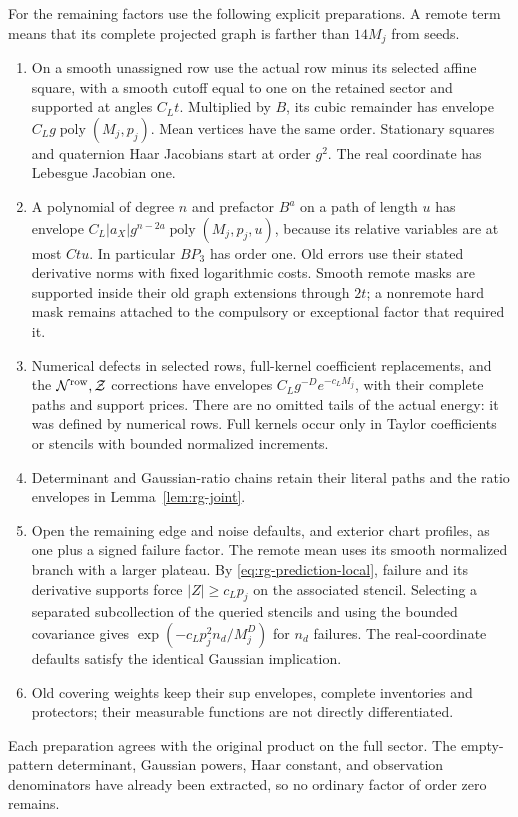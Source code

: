 For the remaining factors use the following explicit preparations.
A remote term means that its complete projected graph is farther than
$14M_j$ from seeds.
\begin{enumerate}[label=\textup{(\roman*)}]
\item On a smooth unassigned row use the actual row minus its selected
      affine square, with a smooth cutoff equal to one on the retained
      sector and supported at angles $C_Lt$.  Multiplied by $B$, its
      cubic remainder has envelope
      $C_Lg\operatorname{poly}(M_j,p_j)$.  Mean vertices have the same
      order.  Stationary squares and quaternion Haar Jacobians start at
      order $g^2$.  The real coordinate has Lebesgue Jacobian one.
\item A polynomial of degree $n$ and prefactor $B^a$ on a path of
      length $u$ has envelope
      $C_L|a_X|g^{n-2a}\operatorname{poly}(M_j,p_j,u)$, because its
      relative variables are at most $Ctu$.  In particular $BP_3$ has
      order one.  Old errors use their stated derivative norms with
      fixed logarithmic costs.  Smooth remote masks are supported inside
      their old graph extensions through $2t$; a nonremote hard mask
      remains attached to the compulsory or exceptional factor that
      required it.
\item Numerical defects in selected rows, full-kernel coefficient
      replacements, and the $\mathcal N^{\rm row},\mathcal Z$
      corrections have envelopes $C_Lg^{-D}e^{-c_LM_j}$, with their
      complete paths and support prices.  There are no omitted tails
      of the actual energy: it was defined by numerical rows.  Full
      kernels occur only in Taylor coefficients or stencils with
      bounded normalized increments.
\item Determinant and Gaussian-ratio chains retain their literal paths
      and the ratio envelopes in Lemma~\ref{lem:rg-joint}.
\item Open the remaining edge and noise defaults, and exterior chart
      profiles, as one plus a signed failure factor.  The remote mean
      uses its smooth normalized branch with a larger plateau.  By
      \eqref{eq:rg-prediction-local}, failure and its derivative supports
      force $|Z|\ge c_Lp_j$ on the associated stencil.  Selecting a separated subcollection of the queried
      stencils and using the bounded covariance gives
      $\exp(-c_Lp_j^2n_d/M_j^D)$ for $n_d$ failures.  The real-coordinate
      defaults satisfy the identical Gaussian implication.
\item Old covering weights keep their sup envelopes, complete
      inventories and protectors; their measurable functions are not
      directly differentiated.
\end{enumerate}
Each preparation agrees with the original product on the full sector.
The empty-pattern determinant, Gaussian powers, Haar constant, and
observation denominators have already been extracted, so no ordinary
factor of order zero remains.

